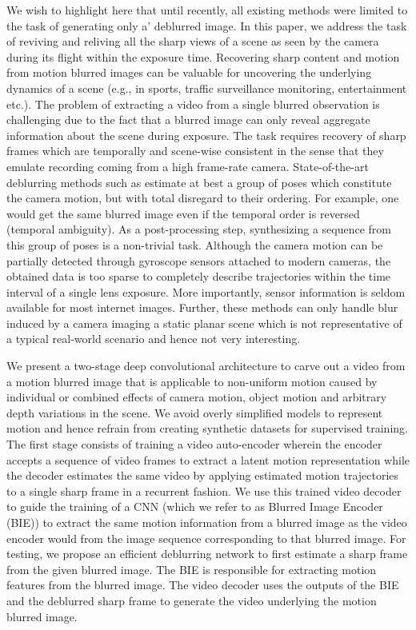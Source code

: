 \documentclass[10pt,twocolumn,letterpaper]{article}
\begin{document}
We wish to highlight here that until recently, all existing methods were limited to the task of generating only a' deblurred image. In this paper, we address the task of reviving and reliving all the sharp views of a scene as seen by the camera during its flight within the exposure time. Recovering sharp content and motion from motion blurred images can be valuable for uncovering the underlying dynamics of a scene (e.g., in sports, traffic surveillance monitoring, entertainment etc.). The problem of extracting a video from a single blurred observation is challenging due to the fact that a blurred image can only reveal aggregate information about the scene during exposure. The task requires recovery of sharp frames which are temporally and scene-wise consistent in the sense that they emulate recording coming from a high frame-rate camera. State-of-the-art deblurring methods such as \cite{vasu2017local} \cite{pan2016blind} estimate at best a group of poses which constitute the camera motion, but with total disregard to their ordering. For example, one would get the same blurred image even if the temporal order is reversed (temporal ambiguity). As a post-processing step, synthesizing a sequence from this group of poses is a non-trivial task. Although the camera motion can be partially detected through gyroscope sensors attached to modern cameras, the obtained data is too sparse to completely describe trajectories within the time interval of a single lens exposure. More importantly, sensor information is seldom available for most internet images. Further, these methods can only handle blur induced by a camera imaging a static planar scene which is not representative of a typical real-world scenario and hence not very interesting. 


We present a two-stage deep convolutional architecture to carve out a video from a motion blurred image that is applicable to non-uniform motion caused by individual or combined effects of camera motion, object motion and arbitrary depth variations in the scene. We avoid overly simplified models to represent motion and hence refrain from creating synthetic datasets for supervised training. The first stage consists of training a video auto-encoder wherein the encoder accepts a sequence of video frames to extract a latent motion representation while the decoder estimates the same video by applying estimated motion trajectories to a single sharp frame in a recurrent fashion. We use this trained video decoder to guide the training of a CNN (which we refer to as Blurred Image Encoder (BIE)) to extract the same motion information from a blurred image as the video encoder would from the image sequence corresponding to that blurred image. For testing, we propose an efficient deblurring network to first estimate a sharp frame from the given blurred image. The BIE is responsible for extracting motion features from the blurred image. The video decoder uses the outputs of the BIE and the deblurred sharp frame to generate the video underlying the motion blurred image.
\end{document}
